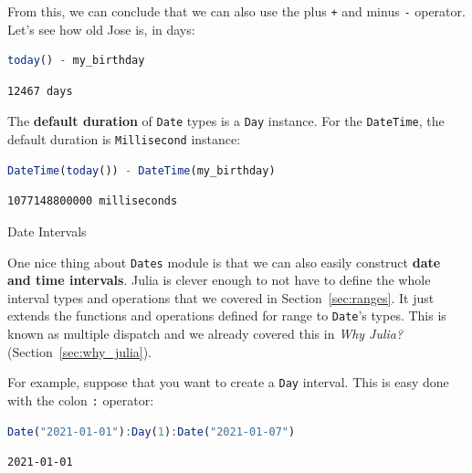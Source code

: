 \documentclass[
  notoc %
]{tufte-book}
\makeatletter
\newcommand{\passthrough}[1]{#1}
\renewcommand\subsubsection{%
\@startsection{subsubsection}{3}{\z@ }{-3.25ex\@plus -1ex \@minus -.2ex}{1.5ex \@plus .2ex}{\normalfont \normalsize \bfseries }
}
\makeatother
\begin{document}
From this, we can conclude that we can also use the plus
\passthrough{\lstinline!+!} and minus \passthrough{\lstinline!-!}
operator. Let's see how old Jose is, in days:

\begin{lstlisting}[language=Julia]
today() - my_birthday
\end{lstlisting}

\begin{lstlisting}[language=Output]
12467 days
\end{lstlisting}

The \textbf{default duration} of \passthrough{\lstinline!Date!} types is
a \passthrough{\lstinline!Day!} instance. For the
\passthrough{\lstinline!DateTime!}, the default duration is
\passthrough{\lstinline!Millisecond!} instance:

\begin{lstlisting}[language=Julia]
DateTime(today()) - DateTime(my_birthday)
\end{lstlisting}

\begin{lstlisting}[language=Output]
1077148800000 milliseconds
\end{lstlisting}

\hypertarget{sec:dates_intervals}{%
\subsubsection{Date Intervals}\label{sec:dates_intervals}}

One nice thing about \passthrough{\lstinline!Dates!} module is that we
can also easily construct \textbf{date and time intervals}. Julia is
clever enough to not have to define the whole interval types and
operations that we covered in Section~\ref{sec:ranges}. It just extends
the functions and operations defined for range to
\passthrough{\lstinline!Date!}'s types. This is known as multiple
dispatch and we already covered this in \emph{Why Julia?}
(Section~\ref{sec:why_julia}).

For example, suppose that you want to create a
\passthrough{\lstinline!Day!} interval. This is easy done with the colon
\passthrough{\lstinline!:!} operator:

\begin{lstlisting}[language=Julia]
Date("2021-01-01"):Day(1):Date("2021-01-07")
\end{lstlisting}

\begin{lstlisting}[language=Output]
2021-01-01
\end{lstlisting}
\end{document}
